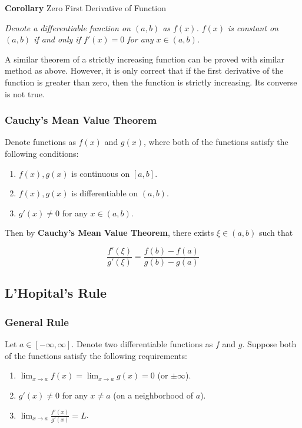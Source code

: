 \documentclass[a4paper,12pt]{article}
\newcommand{\n}{\vspace{3mm}}
\newenvironment{block}[4][Block]{ %
\begin{list}{}{
  \setlength{\leftmargin}{0mm}
  \setlength{\rightmargin}{0mm}
  \setlength{\topsep}{0mm}
  \setlength{\partopsep}{0mm}
  \parsep\parskip
  \setlength{\itemsep}{-\parsep}
  }
  \needspace{\baselineskip}
  \item \textbf{#2 #3} \hspace{1mm} #4
  \vspace{1mm}
  \item
  }
{
\end{list}
}
\newenvironment{alist}{ %
\begin{enumerate}[label=(\alph*)]
}{
\end{enumerate}
}
\begin{document}
\begin{block}{Corollary}{}{Zero First Derivative of Function}
  \textit{Denote a differentiable function on $(a,b)$ as $f(x)$. $f(x)$ is constant on $(a,b)$ if and only if $f'(x)=0$ for any $x\in (a,b)$.}
\end{block}\n

A similar theorem of a strictly increasing function can be proved with similar method as above. However, it is only correct that if the first derivative of the function is greater than zero, then the function is strictly increasing. Its converse is not true.

\subsubsection{Cauchy's Mean Value Theorem}
Denote functions as $f(x)$ and $g(x)$, where both of the functions satisfy the following conditions:

\begin{alist}
  \item $f(x),g(x)$ is continuous on $[a,b]$.
  \item $f(x),g(x)$ is differentiable on $(a,b)$.
  \item $g'(x)\neq 0$ for any $x\in (a,b)$.
\end{alist}

Then by \textbf{Cauchy's Mean Value Theorem}, there exists $\xi\in (a,b)$ such that

$$\frac{f'(\xi)}{g'(\xi)}=\frac{f(b)-f(a)}{g(b)-g(a)}$$

\subsection{L'Hopital's Rule}
\subsubsection{General Rule}
Let $a\in [-\infty,\infty]$. Denote two differentiable functions as $f$ and $g$. Suppose both of the functions satisfy the following requirements:

\begin{alist}
  \item $\lim_{x\to a}f(x)=\lim_{x\to a}g(x)=0$ (or $\pm\infty$).
  \item $g'(x)\neq 0$ for any $x\neq a$ (on a neighborhood of $a$).
  \item $\lim_{x\to a}\frac{f'(x)}{g'(x)}=L$.
\end{alist}
\end{document}
